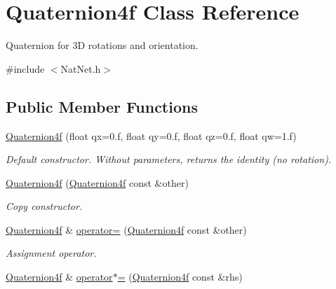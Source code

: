 \hypertarget{classQuaternion4f}{\section{\-Quaternion4f \-Class \-Reference}
\label{classQuaternion4f}
}


\-Quaternion for 3\-D rotations and orientation.  




{\ttfamily \#include $<$\-Nat\-Net.\-h$>$}

\subsection*{\-Public \-Member \-Functions}
\begin{DoxyCompactItemize}
\item 
\hypertarget{classQuaternion4f_aa0b0ab1907488bb4fbdf97ebca59c025}{\hyperlink{classQuaternion4f_aa0b0ab1907488bb4fbdf97ebca59c025}{\-Quaternion4f} (float qx=0.f, float qy=0.f, float qz=0.f, float qw=1.f)}\label{classQuaternion4f_aa0b0ab1907488bb4fbdf97ebca59c025}

\begin{DoxyCompactList}\small\item\em \-Default constructor. \-Without parameters, returns the identity (no rotation). \end{DoxyCompactList}\item 
\hypertarget{classQuaternion4f_a1262b3e2dbb4bd3b83940e08f668d2ba}{\hyperlink{classQuaternion4f_a1262b3e2dbb4bd3b83940e08f668d2ba}{\-Quaternion4f} (\hyperlink{classQuaternion4f}{\-Quaternion4f} const \&other)}\label{classQuaternion4f_a1262b3e2dbb4bd3b83940e08f668d2ba}

\begin{DoxyCompactList}\small\item\em \-Copy constructor. \end{DoxyCompactList}\item 
\hypertarget{classQuaternion4f_a9d549795b575fbeda96bd4308224f875}{\hyperlink{classQuaternion4f}{\-Quaternion4f} \& \hyperlink{classQuaternion4f_a9d549795b575fbeda96bd4308224f875}{operator=} (\hyperlink{classQuaternion4f}{\-Quaternion4f} const \&other)}\label{classQuaternion4f_a9d549795b575fbeda96bd4308224f875}

\begin{DoxyCompactList}\small\item\em \-Assignment operator. \end{DoxyCompactList}\item 
\hypertarget{classQuaternion4f_ad93f8e2f8843aa96d5418b5d4c0122cb}{\hyperlink{classQuaternion4f}{\-Quaternion4f} \& \hyperlink{classQuaternion4f_ad93f8e2f8843aa96d5418b5d4c0122cb}{operator$\ast$=} (\hyperlink{classQuaternion4f}{\-Quaternion4f} const \&rhs)}\label{classQuaternion4f_ad93f8e2f8843aa96d5418b5d4c0122cb}


\end{DoxyCompactItemize}
